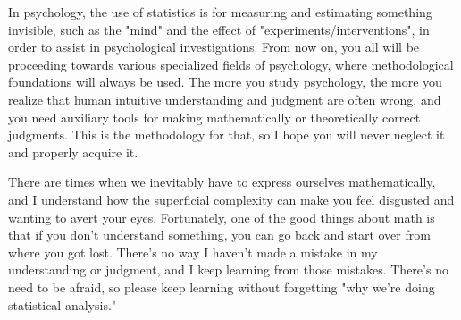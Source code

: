 \documentclass{ltjbook}
\begin{document}
In psychology, the use of statistics is for measuring and estimating something invisible, such as the "mind" and the effect of "experiments/interventions", in order to assist in psychological investigations.
From now on, you all will be proceeding towards various specialized fields of psychology, where methodological foundations will always be used. The more you study psychology, the more you realize that human intuitive understanding and judgment are often wrong, and you need auxiliary tools for making mathematically or theoretically correct judgments. This is the methodology for that, so I hope you will never neglect it and properly acquire it.

There are times when we inevitably have to express ourselves mathematically, and I understand how the superficial complexity can make you feel disgusted and wanting to avert your eyes. Fortunately, one of the good things about math is that if you don't understand something, you can go back and start over from where you got lost. There's no way I haven't made a mistake in my understanding or judgment, and I keep learning from those mistakes. There's no need to be afraid, so please keep learning without forgetting "why we're doing statistical analysis."
\end{document}

